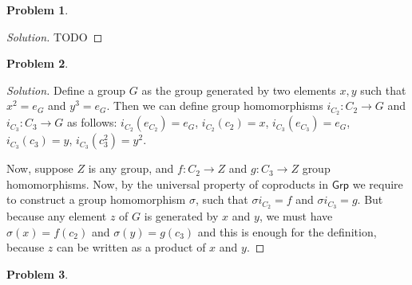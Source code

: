 \documentclass{article}
\theoremstyle{definition}
\newtheorem{problem-internal}{Problem}[subsection]
\newenvironment{problem}{
	\medskip
	\begin{problem-internal}
	}{
\end{problem-internal}
}
\newenvironment{solution}{
	\begin{proof}[Solution]
		\vspace{-8px}
		\setlength{\parskip}{4px}
		\setlength{\parindent}{0px}
	}{
\end{proof}
}
\begin{document}
\begin{problem}
\end{problem}

\begin{solution}
	TODO
\end{solution}

\begin{problem}
\end{problem}

\begin{solution}
	Define a group $G$ as the group generated by two elements $x, y$ such that $x^2=e_G$ and $y^3=e_G$. Then we can define group homomorphisms $i_{C_2}: C_2 \to G$ and $i_{C_3}: C_3 \to G$ as follows: $i_{C_2}(e_{C_2})=e_G$, $i_{C_2}(c_2)=x$, $i_{C_3}(e_{C_3})=e_G$, $i_{C_3}(c_3)=y$, $i_{C_3}(c_3^2)=y^2$.
	
	Now, suppose $Z$ is any group, and $f: C_2 \to Z$ and $g: C_3 \to Z$ group homomorphisms. Now, by the universal property of coproducts in $\mathsf{Grp}$ we require to construct a group homomorphism $\sigma$, such that $\sigma i_{C_2} = f$ and $\sigma i_{C_3} = g$. But because any element $z$ of $G$ is generated by $x$ and $y$, we must have $\sigma(x) = f(c_2)$ and $\sigma(y) = g(c_3)$ and this is enough for the definition, because $z$ can be written as a product of $x$ and $y$.
\end{solution}

\begin{problem}
\end{problem}
\end{document}
